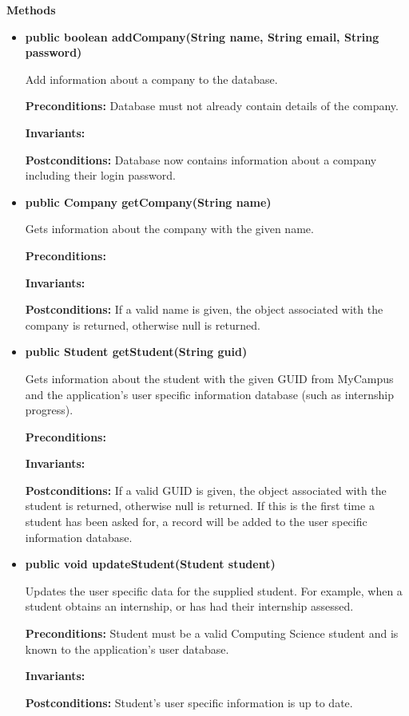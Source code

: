 \documentclass[11pt]{article}
\begin{document}
\textbf{Methods}

\begin{itemize}

\item{\textbf{public boolean addCompany(String name, String email, String 
password)}

Add information about a company to the database.

\textbf{Preconditions:} Database must not already contain details of the 
company.

\textbf{Invariants:}

\textbf{Postconditions:} Database now contains information about a company 
including their login password.}

\item{\textbf{public Company getCompany(String name)}

Gets information about the company with the given name.

\textbf{Preconditions:}

\textbf{Invariants:}

\textbf{Postconditions:} If a valid name is given, the object associated with
the company is returned, otherwise null is returned.}

\item{\textbf{public Student getStudent(String guid)}

Gets information about the student with the given GUID from MyCampus and the
application's user specific information database (such as internship progress).

\textbf{Preconditions:}

\textbf{Invariants:}

\textbf{Postconditions:} If a valid GUID is given, the object associated with
the student is returned, otherwise null is returned. If this is the first time
a student has been asked for, a record will be added to the user specific
information database.}

\item{\textbf{public void updateStudent(Student student)}

Updates the user specific data for the supplied student. For example, when a
student obtains an internship, or has had their internship assessed.

\textbf{Preconditions:} Student must be a valid Computing Science student and
is known to the application's user database.

\textbf{Invariants:}

\textbf{Postconditions:} Student's user specific information is up to date.}

\end{itemize}
\end{document}

